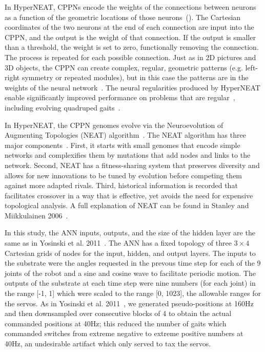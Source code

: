 

In HyperNEAT, CPPNs encode the weights of the connections between neurons as a function of the geometric locations of those neurons~(). The Cartesian coordinates of the two neurons at the end of each connection are input into the CPPN, and the output is the weight of that connection. If the output is smaller than a threshold, the weight is set to zero, functionally removing the connection. The process is repeated for each possible connection. Just as in 2D pictures and 3D objects, the CPPN can create complex, regular, geometric patterns (e.g. left-right symmetry or repeated modules), but in this case the patterns are in the weights of the neural network~\cite{clune2011performance}. The neural regularities produced by HyperNEAT enable significantly improved performance on problems that are regular~\cite{clune2011performance,stanley2009hypercube}, including evolving quadruped gaits~\cite{clune2011performance,clune2009evolving,clune2009sensitivity}. 

In HyperNEAT, the CPPN genomes evolve via the Neuroevolution of Augmenting Topologies (NEAT) algorithm~\cite{stanley2006exploiting}. 
The NEAT algorithm has three major components~\cite{stanley2006exploiting}. 
First, it starts with small genomes that encode simple networks and complexifies them by mutations that add nodes and links to the network. Second, NEAT has a fitness-sharing system that preserves diversity and allows for new innovations to be tuned by evolution before competing them against more adapted rivals. 
Third, historical information is recorded that facilitates crossover in a way that is effective, yet avoids the need for expensive topological analysis. A full explanation of NEAT can be found in Stanley and Miikkulainen 2006~\cite{stanley2006exploiting}. 

In this study, the ANN inputs, outputs, and the size of the hidden layer are the same as in Yosinski et al. 2011~\cite{yos:clune}. 
The ANN has a fixed topology of three \begin{math}3\times4\end{math} Cartesian grids of nodes for the input, hidden, and output layers. 
The inputs to the substrate were the angles requested in the prevous time step for each of the 9 joints of the robot and a sine and cosine wave to facilitate periodic motion. 
The outputs of the substrate at each time step were nine numbers (for each joint) in the range [-1, 1] which were scaled to the range [0, 1023], the allowable ranges for the servos. 
As in Yosinski et al. 2011~\cite{yos:clune}, we generated pseudo-positions at 160Hz and then downsampled over consecutive blocks of 4 to obtain the actual commanded positions at 40Hz; this reduced the number of gaits which commanded switches from extreme negative to extreme positive numbers at 40Hz, an undesirable artifact which only served to tax the servos.

